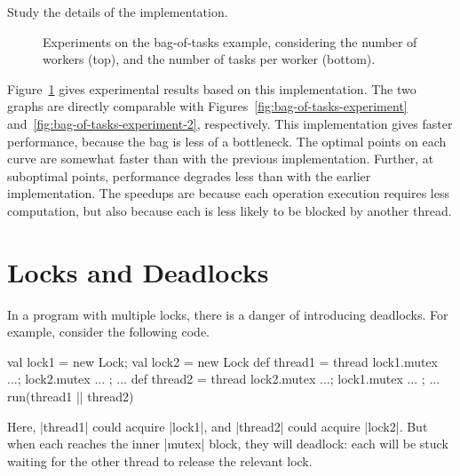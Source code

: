 \begin{instruction}
Study the details of the implementation. 
\end{instruction}



\begin{figure}
\begin{center}


\bigskip


\end{center}
\caption{Experiments on the bag-of-tasks example, considering the number of
  workers (top), and the number of tasks per worker (bottom).}
\label{fig:bag-of-tasks-experiment-monitors}
\end{figure}


Figure~\ref{fig:bag-of-tasks-experiment-monitors}
gives experimental results based on this implementation.  The two graphs are
directly comparable with Figures~\ref{fig:bag-of-tasks-experiment}
and~\ref{fig:bag-of-tasks-experiment-2}, respectively.
%
This implementation gives faster performance, because the bag is less of a
bottleneck.  The optimal points on each curve are somewhat faster than with
the previous implementation.  Further, at suboptimal points, performance
degrades less than with the earlier implementation.  The speedups are 
because each operation execution requires less computation, but also because 
each is less likely to be blocked by another thread.  


\section{Locks and Deadlocks}

In a program with multiple locks, there is a danger of introducing deadlocks.
For example, consider the following code.
%
\begin{scala}
  val lock1 = new Lock; val lock2 = new Lock
  def thread1 = thread{ lock1.mutex{ ...; lock2.mutex{ ... }; ... } }
  def thread2 = thread{ lock2.mutex{ ...; lock1.mutex{ ... }; ... } } 
  run(thread1 || thread2)
\end{scala}
%
Here, |thread1| could acquire |lock1|, and |thread2| could acquire |lock2|.
But when each reaches the inner |mutex| block, they will deadlock: each will
be stuck waiting for the other thread to release the relevant lock. 

